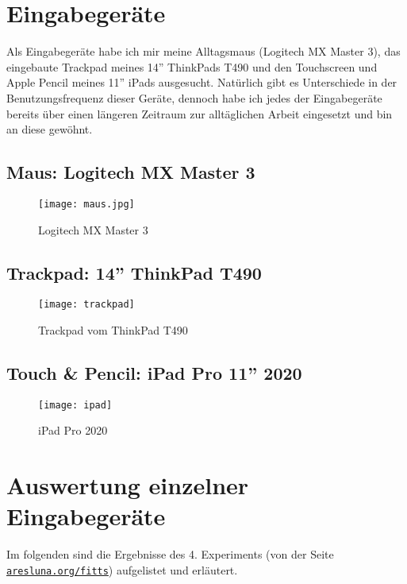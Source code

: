 \documentclass{article}
\begin{document}
\newpage

\section{Eingabegeräte}

Als Eingabegeräte habe ich mir meine Alltagsmaus (Logitech MX Master 3), das
eingebaute Trackpad meines 14'' ThinkPads T490 und den Touchscreen und Apple
Pencil meines 11'' iPads ausgesucht. Natürlich gibt es Unterschiede in der
Benutzungsfrequenz dieser Geräte, dennoch habe ich jedes der Eingabegeräte
bereits über einen längeren Zeitraum zur alltäglichen Arbeit eingesetzt und bin
an diese gewöhnt.

\subsection{Maus: Logitech MX Master 3}

\begin{figure}[h!]
	\centering
	\texttt{[image: maus.jpg]}
	\caption{Logitech MX Master 3}
\end{figure}

\subsection{Trackpad: 14'' ThinkPad T490}

\begin{figure}[h!]
	\centering
	\texttt{[image: trackpad]}
	\caption{Trackpad vom ThinkPad T490}
\end{figure}

\subsection{Touch \& Pencil: iPad Pro 11'' 2020}

\begin{figure}[h!]
	\centering
	\texttt{[image: ipad]}
	\caption{iPad Pro 2020}
\end{figure}

\section{Auswertung einzelner Eingabegeräte}

Im folgenden sind die Ergebnisse des 4. Experiments (von der Seite
\href{https://www.aresluna.org/fitts}{\texttt{aresluna.org/fitts}}) aufgelistet
und erläutert.
\end{document}
